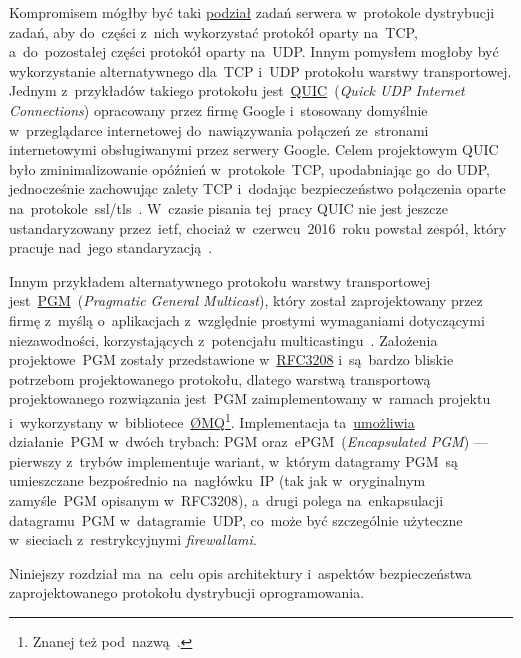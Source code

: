 \documentclass[thesis]{subfiles}
\begin{document}
Kompromisem mógłby być taki \hyperlink{server-role}{podział} zadań serwera w~protokole dystrybucji zadań, aby do~części z~nich wykorzystać protokół oparty na~TCP, a~do~pozostałej części protokół oparty na~UDP. Innym pomysłem mogłoby być wykorzystanie alternatywnego dla~TCP i~UDP protokołu warstwy transportowej. Jednym z~przykładów takiego protokołu jest~\href{https://en.wikipedia.org/wiki/QUIC}{QUIC}~(\emph{Quick UDP Internet Connections}) opracowany przez firmę Google i~stosowany domyślnie w~przeglądarce internetowej  do~nawiązywania połączeń ze~stronami internetowymi obsługiwanymi przez serwery Google. Celem projektowym QUIC było zminimalizowanie opóźnień w~protokole~TCP, upodabniając go~do UDP, jednocześnie zachowując zalety TCP i~dodając bezpieczeństwo połączenia oparte na~protokole~\gls{ssl/tls}~\cite{quic-wire-layout-spec,quic-crypto,quic-roskind}. W~czasie pisania tej~pracy QUIC nie jest jeszcze ustandaryzowany przez~\gls{ietf}, chociaż w~czerwcu~2016~roku powstał zespół, który pracuje nad~jego standaryzacją~\cite{quic-draft,quic-workinggroup}.

Innym przykładem alternatywnego protokołu warstwy transportowej jest~\href{https://en.wikipedia.org/wiki/Pragmatic_General_Multicast}{PGM}~(\emph{Pragmatic General Multicast}), który został zaprojektowany przez firmę  z~myślą o~aplikacjach z~względnie prostymi wymaganiami dotyczącymi niezawodności, korzystających z~potencjału multicastingu~\cite{pgm-rfc}. Założenia projektowe~PGM zostały przedstawione w~\href{https://tools.ietf.org/html/rfc3208}{RFC3208} i~są~bardzo bliskie potrzebom projektowanego protokołu, dlatego warstwą transportową projektowanego rozwiązania jest~PGM zaimplementowany w~ramach projektu  i~wykorzystany w~bibliotece~\href{http://zeromq.org/}{ØMQ}\footnote{Znanej też pod~nazwą~.}. Implementacja ta~\href{http://api.zeromq.org/2-1:zmq-pgm}{umożliwia} działanie~PGM w~dwóch trybach: PGM oraz~ePGM~(\emph{Encapsulated PGM}) --- pierwszy z~trybów implementuje wariant, w~którym datagramy PGM~są umieszczane bezpośrednio na~nagłówku~IP (tak jak w~oryginalnym zamyśle~PGM opisanym w~RFC3208), a~drugi polega na~enkapsulacji datagramu~PGM w~datagramie~UDP, co~może być szczególnie użyteczne w~sieciach z~restrykcyjnymi \emph{firewallami}. %

Niniejszy rozdział ma~na~celu opis architektury i~aspektów bezpieczeństwa zaprojektowanego protokołu dystrybucji oprogramowania.
\end{document}
